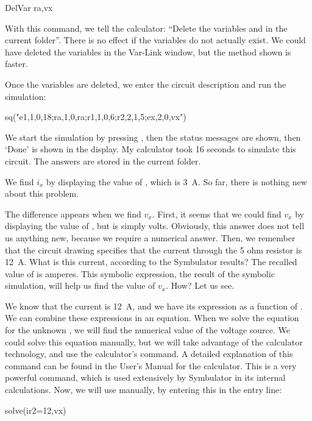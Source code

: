 \begin{entry}
DelVar ra,vx
\end{entry}

With this command, we tell the calculator: ``Delete the variables
 and  in the current folder''. There is no effect
if the variables do not actually exist. We could have deleted the
variables in the Var-Link window, but the method shown is faster.

Once the variables are deleted, we enter the circuit description and
run the simulation:

\begin{entry}
sq\dc("e1,1,0,18;ra,1,0,ra;r1,1,0,6;r2,2,1,5;ex,2,0,vx")
\end{entry}

We start the simulation by pressing , then the status
messages are shown, then `Done' is shown in the display. My
calculator took 16 seconds to simulate this circuit. The answers are
stored in the current folder.

We find $i_x$ by displaying the value of , which is 3~A.
So far, there is nothing new about this problem.

The difference appears when we find $v_x$. First, it seems that we
could find $v_x$ by displaying the value of , but 
is simply  volts. Obviously, this answer does not tell us
anything new, because we require a numerical answer. Then, we
remember that the circuit drawing specifies that the current through
the 5 ohm resistor is 12~A. What is this current, according to the
Symbulator results? The recalled value of  is
 amperes. This symbolic expression, the result of
the symbolic simulation, will help us find the value of $v_x$. How?
Let us see.

We know that the current is 12~A, and we have its expression as a
function of . We can combine these expressions in an
equation. When we solve the equation for the unknown , we
will find the numerical value of the voltage source. We could solve
this equation manually, but we will take advantage of the calculator
technology, and use the calculator's  command. A
detailed explanation of this command can be found in the User's
Manual for the calculator. This is a very powerful command, which is
used extensively by Symbulator in its internal calculations. Now, we
will use  manually, by entering this in the entry line:

\begin{entry}
solve(ir2=12,vx)
\end{entry}

